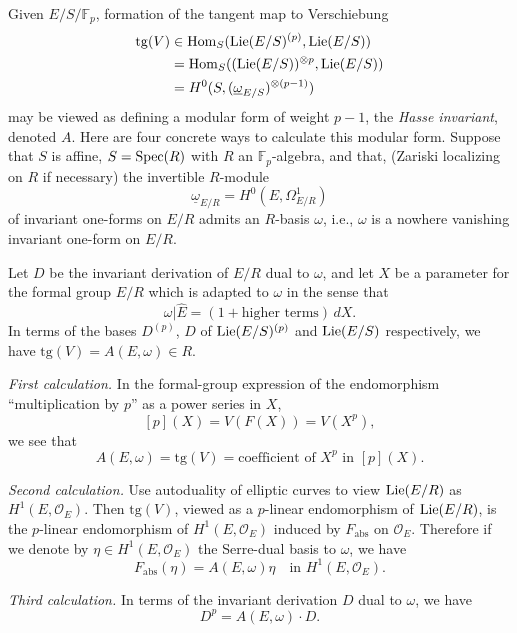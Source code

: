 \kmitem\label{item:12.4.1}
Given $E/S/\mathbb{F}_p$, formation of the tangent map to Verschiebung
\[
\begin{aligned}
\mathrm{tg}(V) &\in \operatorname{Hom}_S(\operatorname{Lie}(E/S)^{(p)}, \operatorname{Lie}(E/S)) \\
&= \operatorname{Hom}_S((\operatorname{Lie}(E/S))^{\otimes p}, \operatorname{Lie}(E/S)) \\
&= H^0(S, (\underline{\omega}_{E/S})^{\otimes (p-1)})
\end{aligned}
\]
may be viewed as defining a modular form of weight $p-1$, the \emph{Hasse invariant}, denoted $A$. Here are four concrete ways to calculate this modular form. Suppose that $S$ is affine, $S = \operatorname{Spec}(R)$ with $R$ an $\mathbb{F}_p$-algebra, and that, (Zariski localizing on $R$ if necessary) the invertible $R$-module
\[
\underline{\omega}_{E/R} = H^0(E, \Omega^1_{E/R})
\]
of invariant one-forms on $E/R$ admits an $R$-basis $\omega$, i.e., $\omega$ is a nowhere vanishing invariant one-form on $E/R$.

Let $D$ be the invariant derivation of $E/R$ dual to $\omega$, and let $X$ be a parameter for the formal group $\widehat{E}/R$ which is adapted to $\omega$ in the sense that
\[
\omega | \widehat{E} = (1 + \text{higher terms})\, dX .
\]
In terms of the bases $D^{(p)}$, $D$ of $\operatorname{Lie}(E/S)^{(p)}$ and $\operatorname{Lie}(E/S)$ respectively, we have $\mathrm{tg}(V) = A(E,\omega) \in R$.

\kmitem\label{item:12.4.1.1}
\emph{First calculation.} In the formal-group expression of the endomorphism ``multiplication by $p$'' as a power series in $X$,
\[
[p](X) = V(F(X)) = V(X^p) ,
\]
we see that
\[
A(E,\omega) = \mathrm{tg}(V) = \text{coefficient of } X^p \text{ in } [p](X) .
\]

\kmitem\label{item:12.4.1.2}
\emph{Second calculation.} Use autoduality of elliptic curves to view $\operatorname{Lie}(E/R)$ as $H^1(E, \mathcal{O}_E)$. Then $\mathrm{tg}(V)$, viewed as a $p$-linear endomorphism of $\operatorname{Lie}(E/R)$, is the $p$-linear endomorphism of $H^1(E, \mathcal{O}_E)$ induced by $F_{\mathrm{abs}}$ on $\mathcal{O}_E$. Therefore if we denote by $\eta \in H^1(E, \mathcal{O}_E)$ the Serre-dual basis to $\omega$, we have
\[
F_{\mathrm{abs}}(\eta) = A(E,\omega)\eta \quad \text{in } H^1(E, \mathcal{O}_E) .
\]

\kmitem\label{item:12.4.1.3}
\emph{Third calculation.} In terms of the invariant derivation $D$ dual to $\omega$, we have
\[
D^p = A(E,\omega) \cdot D .
\]

